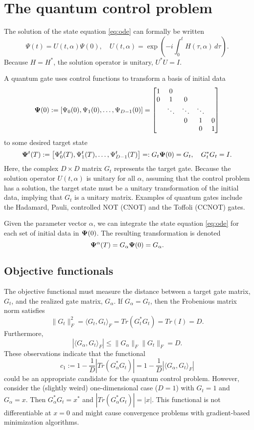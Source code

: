 \documentclass[11pt]{article}
\begin{document}
\section{The quantum control problem}

The solution of the state equation \eqref{eq:ode} can formally be written
\[
\Psi(t) = U(t,\alpha)\Psi(0),\quad U(t,\alpha) = \exp\left(-i\int_0^t H(\tau,\alpha)\, d\tau \right).
\]
Because $H=H^*$, the solution operator is unitary, $U^* U = I$.

A quantum gate uses control functions to transform a basis of initial data
\[
{\mathbf \Psi}(0):=\left[ \Psi_0(0), \Psi_1(0),\ldots, \Psi_{D-1}(0)\right]= \begin{bmatrix}
  1 & 0 &    & & \\
  0 & 1 & 0 & & \\
  & \ddots & \ddots & \ddots &\\
  &       & 0 & 1 & 0\\
  &       &    & 0 & 1
  \end{bmatrix}
\]
to some desired target state
\[
{\mathbf \Psi}^t(T):=\left[ \Psi^t_0(T), \Psi^t_1(T),\ldots, \Psi^t_{D-1}(T)\right]=: G_t{\mathbf \Psi}(0)= G_t,\quad G_t^* G_t=I.
\]
Here, the complex $D\times D$ matrix $G_t$ represents the target gate. Because the solution operator
$U(t,\alpha)$ is unitary for all $\alpha$, assuming that the control problem has a solution, the
target state must be a unitary transformation of the initial data, implying that $G_t$ is a unitary
matrix. Examples of quantum gates include the Hadamard, Pauli, controlled NOT (CNOT) and the Toffoli
(CCNOT) gates.

Given the parameter vector $\alpha$, we can integrate the state equation \eqref{eq:ode} for each
set of initial data in ${\mathbf \Psi}(0)$. The resulting transformation is denoted
\[
{\mathbf \Psi}^\alpha(T) = G_\alpha {\mathbf \Psi}(0) = G_\alpha.
\]

\subsection{Objective functionals}
The objective functional must measure the distance between a target gate matrix, $G_t$, and the
realized gate matrix, $G_\alpha$. If $G_\alpha=G_t$, then the Frobenious matrix norm satisfies
\[
\| G_t \|^2_F = \langle G_t, G_t \rangle_F = Tr(G_t^* G_t) = Tr(I) = D.
\]
Furthermore,
\[
|\langle  G_\alpha,G_t \rangle_F | \leq \|G_\alpha\|_F \|G_t\|_F = D.
\]
These observations indicate that the functional
\begin{equation}\label{eq_trace-linear}
c_1 := 1 - \frac{1}{D} |Tr (G_\alpha^* G_t)| =  1 - \frac{1}{D} |\langle G_\alpha, G_t\rangle_F|
\end{equation}
could be an appropriate candidate for the quantum control problem. However, consider the (slightly
weird) one-dimensional case ($D=1$) with $G_t=1$ and $G_\alpha=x$. Then $G_\alpha^* G_t = x^*$ and
$|Tr (G_\alpha^* G_t)| = |x|$. This functional is not differentiable at $x=0$ and might cause
convergence problems with gradient-based minimization algorithms.
\end{document}

